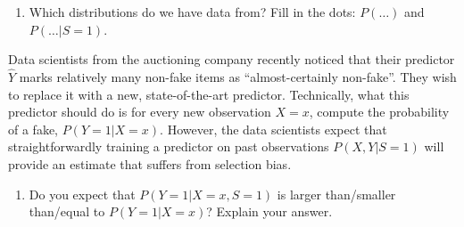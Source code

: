 \begin{enumerate}[label=\alph*)]
{\begin{itemize}
        \end{itemize}
    }
  \item %
    Which distributions do we have data from? Fill in the dots:
    $P(\dots)$ and $P(\dots | S=1)$.
\end{enumerate}
Data scientists from the auctioning company recently noticed that their predictor $\hat{Y}$ marks relatively many non-fake items as ``almost-certainly non-fake''.
They wish to replace it with a new, state-of-the-art predictor. 
Technically, what this predictor should do is for every new observation $X=x$, compute the probability of a fake, $P(Y=1|X=x)$. 
However, the data scientists expect that straightforwardly training a predictor on past observations $P(X, Y|S=1)$ will provide an estimate that suffers from selection bias.
\begin{enumerate}[resume*]
  \item 
    Do you expect that $P(Y=1|X=x,S=1)$ is larger than/smaller than/equal to $P(Y=1|X=x)$? 
    Explain your answer.
\end{enumerate}

